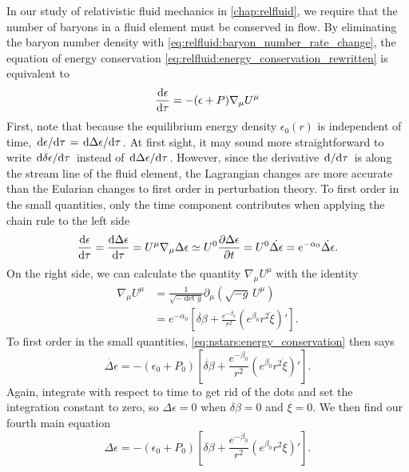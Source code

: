In our study of relativistic fluid mechanics in \cref{chap:relfluid}, we require that the number of baryons in a fluid element must be conserved in flow.
By eliminating the baryon number density with \cref{eq:relfluid:baryon_number_rate_change}, the equation of energy conservation \eqref{eq:relfluid:energy_conservation_rewritten} is equivalent to
\begin{equation}
	\odv{\epsilon}{\tau} = -(\epsilon+P) \nabla_\mu U^\mu 
\label{eq:nstars:energy_conservation}
\end{equation}
First, note that because the equilibrium energy density $\epsilon_0(r)$ is independent of time, $\odv{\epsilon}/{\tau} = \odv{\Delta \epsilon}/{\tau}$.
At first sight, it may sound more straightforward to write $\odv{\delta \epsilon}/{\tau}$ instead of $\odv{\Delta \epsilon}/{\tau}$.
However, since the derivative $\odv{}/{\tau}$ is along the stream line of the fluid element, the Lagrangian changes are more accurate than the Eularian changes to first order in perturbation theory.
To first order in the small quantities, only the time component contributes when applying the chain rule to the left side
\begin{equation}
	\odv{\epsilon}{\tau} =
	\odv{\Delta \epsilon}{\tau} =
	U^\mu \nabla_\mu \Delta \epsilon \taylor
	U^0 \pdv{\Delta \epsilon}{t} = U^0 \dot{\Delta \epsilon} =
	e^{-\alpha_0} \dot{\Delta \epsilon} .
\end{equation}
On the right side, we can calculate the quantity $\nabla_\mu U^\mu$ with the identity
\begin{equation}
\begin{split}
	\nabla_\mu U^\mu &= \frac{1}{\sqrt{-\det{g}}} \partial_\mu \left( \sqrt{-g} \, U^\mu \right) \\
	                 &= e^{-\alpha_0} \left[ \dot{\delta\beta} + \frac{e^{-\beta_0}}{r^2} \left( e^{\beta_0} r^2 \dot\xi \right)' \right] .
\end{split}
\end{equation}
To first order in the small quantities, \cref{eq:nstars:energy_conservation} then says
\begin{equation}
	\dot{\Delta \epsilon} = - \left( \epsilon_0 + P_0 \right) \left[ \dot{\delta\beta} + \frac{e^{-\beta_0}}{r^2} \left( e^{\beta_0} r^2 \dot\xi \right)' \right] .
\end{equation}
Again, integrate with respect to time to get rid of the dots and set the integration constant to zero, so $\Delta \epsilon = 0$ when $\delta \beta = 0$ and $\xi = 0$.
We then find our fourth main equation
\begin{equation}
	\Delta \epsilon = - \left( \epsilon_0 + P_0 \right) \left[ \delta\beta + \frac{e^{-\beta_0}}{r^2} \left( e^{\beta_0} r^2 \xi \right)' \right] .
\label{eq:nstars:Delta_epsilon}
\end{equation}

